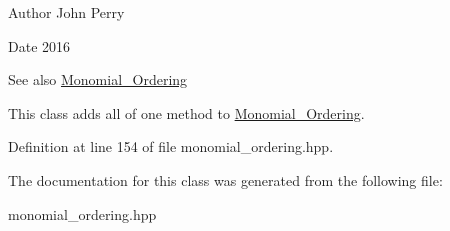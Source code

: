 \begin{DoxyAuthor}{Author}
John Perry 
\end{DoxyAuthor}
\begin{DoxyDate}{Date}
2016 
\end{DoxyDate}
\begin{DoxySeeAlso}{See also}
\hyperlink{class_monomial___ordering}{Monomial\+\_\+\+Ordering}
\end{DoxySeeAlso}
This class adds all of one method to \hyperlink{class_monomial___ordering}{Monomial\+\_\+\+Ordering}. 

Definition at line 154 of file monomial\+\_\+ordering.\+hpp.



The documentation for this class was generated from the following file\+:\begin{DoxyCompactItemize}
\item 
monomial\+\_\+ordering.\+hpp\end{DoxyCompactItemize}
